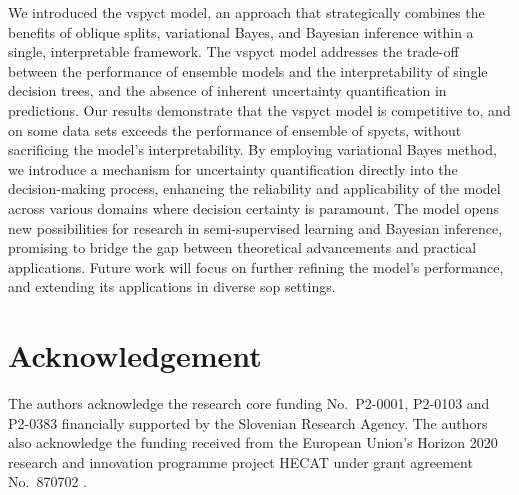 \documentclass[3p,review,authoryear]{elsarticle}
\begin{document}
We introduced the \gls{vspyct} model, an approach that strategically combines the benefits of oblique splits, variational Bayes, and Bayesian inference within a single, interpretable framework.
The \gls{vspyct} model addresses the trade-off between the performance of ensemble models and the interpretability of single decision trees, and the absence of inherent uncertainty quantification in predictions.
Our results demonstrate that the \gls{vspyct} model is competitive to, and on some data sets exceeds the performance of ensemble of \glspl{spyct}, without sacrificing the model's interpretability.
By employing variational Bayes method, we introduce a mechanism for uncertainty quantification directly into the decision-making process, enhancing the reliability and applicability of the model across various domains where decision certainty is paramount.
The model opens new possibilities for research in semi-supervised learning and Bayesian inference, promising to bridge the gap between theoretical advancements and practical applications.
Future work will focus on further refining the model's performance, and extending its applications in diverse \gls{sop} settings.

\section*{Acknowledgement}
The authors acknowledge the research core funding No.\ P2-0001,  P2-0103 and P2-0383 financially supported by the Slovenian Research Agency.
The authors also acknowledge the funding received from the European Union's Horizon 2020 research and innovation programme project HECAT under grant agreement No.\ 870702 .




\end{document}
